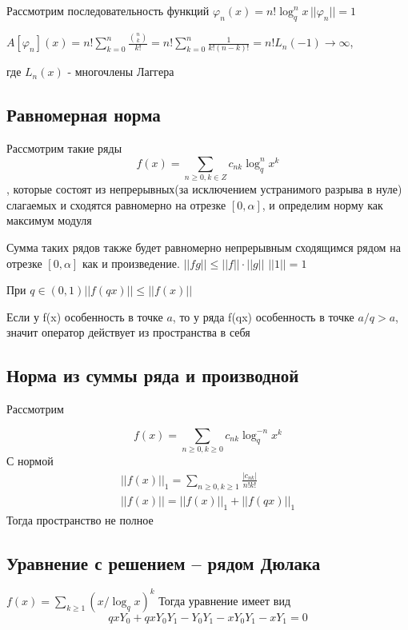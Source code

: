 \documentclass{article}
\begin{document}
	Рассмотрим последовательность функций $\varphi_n(x) = n!\log_q^n x \, ||\varphi_n|| = 1$
	
	$A[\varphi_n](x) = n!\sum_{k=0}^n \frac{\binom{n}{k}}{k!} = n! \sum_{k=0}^n\frac{1}{k!(n-k)!}= n! L_n(-1) \to \infty $,
	
	где $L_n(x)$ - многочлены Лаггера
	
	
	\subsection{Равномерная норма}
	
	Рассмотрим такие ряды
	$$ f(x) = \sum_{n \geq 0,k\in  {Z}} c_{nk} \log_q^n x^k $$, которые состоят из непрерывных(за исключением устранимого разрыва в нуле) слагаемых и сходятся равномерно на отрезке $[0,\alpha]$, и определим норму как максимум модуля
	
	Сумма таких рядов также будет равномерно непрерывным сходящимся рядом на отрезке $[0,\alpha]$ как и произведение.
	$||f g|| \leq ||f||\cdot||g||$
	$||1||=1$
	
	При $q \in (0,1)  ||f(qx)|| \leq ||f(x)||$
	
	Если у f(x) особенность в точке $a$, то у ряда f(qx) особенность в точке $a/q > a$, значит оператор действует из пространства в себя
	
	\subsection{Норма из суммы ряда и производной}
	
	Рассмотрим
	
	
	\begin{equation}
		f(x) = \sum_{n \geq 0,k\geq 0} c_{nk} \log_q^{-n} x^k
	\end{equation}
	С нормой
	\begin{align}
		||f(x)||_1 = \sum_{n\geq 0 , k \geq 1} \frac{|c_{nk}|}{n!k!}\\
		||f(x)|| = ||f(x)||_1 + ||f(qx)||_1
	\end{align}
	Тогда пространство не полное
	
	
	
	\subsection{Уравнение с решением -- рядом Дюлака}
	
	$f(x) = \sum_{k\geq1} (x/\log_q x)^k$
	Тогда уравнение 
	имеет вид
	$$ qxY_0+ qx Y_0 Y_1 - Y_0 Y_1 - x Y_0 Y_1 - x Y_1 = 0 $$
	
\end{document}
